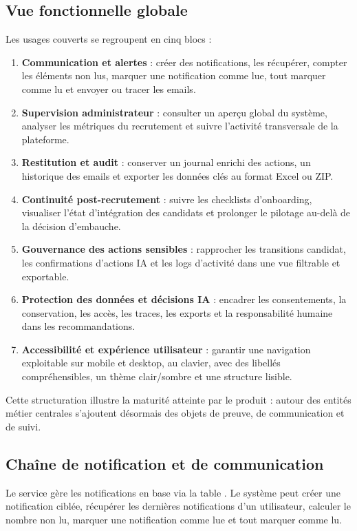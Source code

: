 \subsection{Vue fonctionnelle globale}
Les usages couverts se regroupent en cinq blocs :
\begin{enumerate}
  \item \textbf{Communication et alertes} : créer des notifications, les récupérer, compter les éléments non lus, marquer une notification comme lue, tout marquer comme lu et envoyer ou tracer les emails.
  \item \textbf{Supervision administrateur} : consulter un aperçu global du système, analyser les métriques du recrutement et suivre l'activité transversale de la plateforme.
  \item \textbf{Restitution et audit} : conserver un journal enrichi des actions, un historique des emails et exporter les données clés au format Excel ou ZIP.
  \item \textbf{Continuité post-recrutement} : suivre les checklists d'onboarding, visualiser l'état d'intégration des candidats  et prolonger le pilotage au-delà de la décision d'embauche.
  \item \textbf{Gouvernance des actions sensibles} : rapprocher les transitions candidat, les confirmations d'actions IA et les logs d'activité dans une vue filtrable et exportable.
  \item \textbf{Protection des données et décisions IA} : encadrer les consentements, la conservation, les accès, les traces, les exports et la responsabilité humaine dans les recommandations.
  \item \textbf{Accessibilité et expérience utilisateur} : garantir une navigation exploitable sur mobile et desktop, au clavier, avec des libellés compréhensibles, un thème clair/sombre et une structure lisible.
\end{enumerate}

Cette structuration illustre la maturité atteinte par le produit : autour des entités métier centrales s'ajoutent désormais des objets de preuve, de communication et de suivi.

\subsection{Chaîne de notification et de communication}
Le service  gère les notifications en base via la table . Le système peut créer une notification ciblée, récupérer les dernières notifications d'un utilisateur, calculer le nombre non lu, marquer une notification comme lue et tout marquer comme lu.

